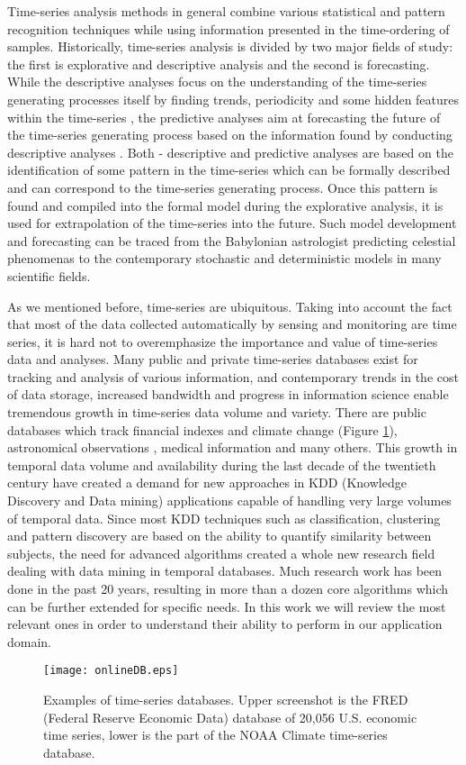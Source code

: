 Time-series analysis methods in general combine various statistical and pattern recognition techniques while using information presented in the time-ordering of samples. Historically, time-series analysis is divided by two major fields of study: the first is explorative and descriptive analysis and the second is forecasting. 
While the descriptive analyses focus on the understanding of the time-series generating processes itself by finding trends, periodicity and some hidden features within the time-series \cite{citeulike:2206845}, the predictive analyses aim at forecasting the future of the time-series generating process based on the information found by conducting descriptive analyses \cite{citeulike:3449765}. 
Both - descriptive and predictive analyses are based on the identification of some pattern in the time-series which can be formally described and can correspond to the time-series generating process. Once this pattern is found and compiled into the formal model during the explorative analysis, it is used for extrapolation of the time-series into the future. Such  model development and forecasting can be traced from the Babylonian astrologist predicting celestial phenomenas to the contemporary stochastic and deterministic models in many scientific fields.

As we mentioned before, time-series are ubiquitous. Taking into account the fact that most of the data collected automatically by sensing and monitoring are time series, it is hard not to overemphasize the importance and value of time-series data and analyses. Many public and private time-series databases exist for tracking and analysis of various information, and contemporary trends in the cost of data storage, increased bandwidth and progress in information science enable tremendous growth in time-series data volume and variety. There are public databases which track financial indexes and climate change (Figure \ref{fig:onlineDB}), astronomical observations \cite{citeulike:4373331}, medical information \cite{citeulike:4373332} and many others.  This growth in temporal data volume and availability during the last decade of the twentieth century have created a demand for new approaches in KDD (Knowledge Discovery and Data mining) applications capable of handling very large volumes of temporal data. Since most KDD techniques such as classification, clustering and pattern discovery are based on the ability to quantify similarity between subjects, the need for advanced algorithms created a whole new research field dealing with data mining in temporal databases. Much research work has been done in the past 20 years, resulting in more than a dozen core algorithms which can be further extended for specific needs. In this work we will review the most relevant ones in order to understand their ability to perform in our application domain.

\begin{figure}[tbp]
   \centering
   \texttt{[image: onlineDB.eps]}
   \caption{Examples of time-series databases. Upper screenshot is the FRED (Federal Reserve Economic Data) database of 20,056 U.S. economic time series, lower is the part of the NOAA Climate time-series database.}
   \label{fig:onlineDB}
\end{figure} 

